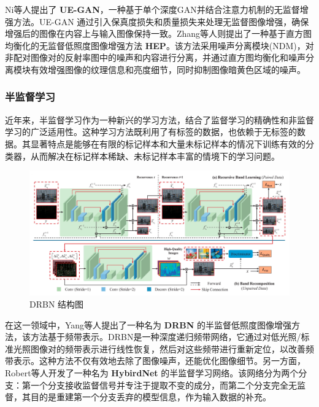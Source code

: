 \documentclass[a4paper, 10pt]{article}
\begin{document}
	Ni等人\cite{ni2020towards}提出了 \textbf{UE-GAN}，一种基于单个深度GAN并结合注意力机制的无监督增强方法。UE-GAN 通过引入保真度损失和质量损失来处理无监督图像增强，确保增强后的图像在内容上与输入图像保持一致。Zhang等人\cite{zhang2021unsupervised}则提出了一种基于直方图均衡化的无监督低照度图像增强方法 \textbf{HEP}。该方法采用噪声分离模块(NDM)，对非配对图像对的反射率图中的噪声和内容进行分离，并通过直方图均衡化和噪声分离模块有效增强图像的纹理信息和亮度细节，同时抑制图像暗黄色区域的噪声。
	
	\subsubsection{半监督学习}
	
	近年来，半监督学习作为一种新兴的学习方法，结合了监督学习的精确性和非监督学习的广泛适用性。这种学习方法既利用了有标签的数据，也依赖于无标签的数据。其显著特点是能够在有限的标记样本和大量未标记样本的情况下训练有效的分类器，从而解决在标记样本稀缺、未标记样本丰富的情境下的学习问题。
	
	\begin{figure}[htb]
		\centering 
		\includegraphics[width=\columnwidth]{picture/LLIE/DRBN/DRBN}
		\caption{
			\label{fig: DRBN} 
			DRBN 结构图
		}
	\end{figure}
	
	在这一领域中，Yang等人\cite{qiao2021deep}提出了一种名为 \textbf{DRBN} 的半监督低照度图像增强方法，该方法基于频带表示。DRBN是一种深度递归频带网络，它通过对低光照/标准光照图像对的频带表示进行线性恢复，然后对这些频带进行重新定位，以改善频带表示。这种方法不仅有效地去除了图像噪声，还能优化图像细节。另一方面，Robert等人开发了一种名为 \textbf{HybirdNet} 的半监督学习网络\cite{robert2018hybridnet}。该网络分为两个分支：第一个分支接收监督信号并专注于提取不变的成分，而第二个分支完全无监督，其目的是重建第一个分支丢弃的模型信息，作为输入数据的补充。
	
\end{document}
